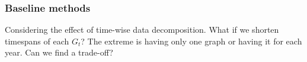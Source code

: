 





\subsubsection{Baseline methods}

Considering the effect of time-wise data decomposition. What if we shorten timespans of each $G_t$? The extreme is having only one graph or having it for each year. Can we find a trade-off?

